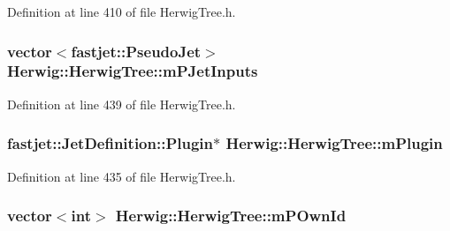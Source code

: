 Definition at line 410 of file Herwig\+Tree.\+h.

\subsubsection[{\texorpdfstring{m\+P\+Jet\+Inputs}{mPJetInputs}}]{\setlength{\rightskip}{0pt plus 5cm}vector$<$fastjet\+::\+Pseudo\+Jet$>$ Herwig\+::\+Herwig\+Tree\+::m\+P\+Jet\+Inputs\hspace{0.3cm}{\ttfamily [protected]}}\hypertarget{class_herwig_1_1_herwig_tree_a595863c9ae182137ddaab450045c50a6}{}\label{class_herwig_1_1_herwig_tree_a595863c9ae182137ddaab450045c50a6}


Definition at line 439 of file Herwig\+Tree.\+h.

\subsubsection[{\texorpdfstring{m\+Plugin}{mPlugin}}]{\setlength{\rightskip}{0pt plus 5cm}fastjet\+::\+Jet\+Definition\+::\+Plugin$\ast$ Herwig\+::\+Herwig\+Tree\+::m\+Plugin\hspace{0.3cm}{\ttfamily [protected]}}\hypertarget{class_herwig_1_1_herwig_tree_a0ca52a2a08bedfe7c516f3efd133d489}{}\label{class_herwig_1_1_herwig_tree_a0ca52a2a08bedfe7c516f3efd133d489}


Definition at line 435 of file Herwig\+Tree.\+h.

\subsubsection[{\texorpdfstring{m\+P\+Own\+Id}{mPOwnId}}]{\setlength{\rightskip}{0pt plus 5cm}vector$<$int$>$ Herwig\+::\+Herwig\+Tree\+::m\+P\+Own\+Id\hspace{0.3cm}{\ttfamily [protected]}}\hypertarget{class_herwig_1_1_herwig_tree_a11a7a3ded9e4268d2a1152e48de1c761}{}\label{class_herwig_1_1_herwig_tree_a11a7a3ded9e4268d2a1152e48de1c761}


